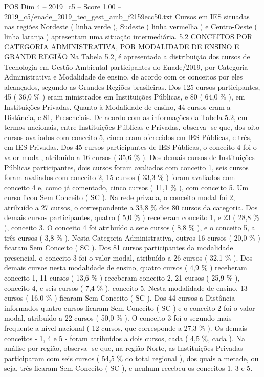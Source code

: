 \begin{textsample}{POS Dim 4 – 2019\_c5 – Score 1.00 – 2019\_c5/enade\_2019\_tec\_gest\_amb\_f2159ecc50.txt}
Cursos em IES situadas nas regiões Nordeste ( linha verde ), Sudeste ( linha vermelha ) e Centro-Oeste ( linha laranja ) apresentam uma situação intermediária. 5.2 CONCEITOS POR CATEGORIA ADMINISTRATIVA, POR MODALIDADE DE ENSINO E GRANDE REGIÃO Na Tabela 5.2, é apresentada a distribuição dos cursos de Tecnologia em Gestão Ambiental participantes do Enade/2019, por Categoria Administrativa e Modalidade de ensino, de acordo com os conceitos por eles alcançados, segundo as Grandes Regiões brasileiras.
Dos 125 cursos participantes, 45 ( 36,0 \% ) eram ministrados em Instituições Públicas, e 80 ( 64,0 \% ), em Instituições Privadas.
Quanto à Modalidade de ensino, 44 cursos eram a Distância, e 81, Presenciais.
De acordo com as informações da Tabela 5.2, em termos nacionais, entre Instituições Públicas e Privadas, observa -se que, dos oito cursos avaliados com conceito 5, cinco eram oferecidos em IES Públicas, e três, em IES Privadas.
Dos 45 cursos participantes de IES Públicas, o conceito 4 foi o valor modal, atribuído a 16 cursos ( 35,6 \% ).
Dos demais cursos de Instituições Públicas participantes, dois cursos foram avaliados com conceito 1, seis cursos foram avaliados com conceito 2, 15 cursos ( 33,3 \% ) foram avaliados com conceito 4 e, como já comentado, cinco cursos ( 11,1 \% ), com conceito 5.
Um curso ficou Sem Conceito ( SC ).
Na rede privada, o conceito modal foi 2, atribuído a 27 cursos, o correspondente a 33,8 \% dos 80 cursos da categoria.
Dos demais cursos participantes, quatro ( 5,0 \% ) receberam conceito 1, e 23 ( 28,8 \% ), conceito 3.
O conceito 4 foi atribuído a sete cursos ( 8,8 \% ), e o conceito 5, a três cursos ( 3,8 \% ).
Nesta Categoria Administrativa, outros 16 cursos ( 20,0 \% ) ficaram Sem Conceito ( SC ).
Dos 81 cursos participantes da modalidade presencial, o conceito 3 foi o valor modal, atribuído a 26 cursos ( 32,1 \% ).
Dos demais cursos nesta modalidade de ensino, quatro cursos ( 4,9 \% ) receberam conceito 1, 11 cursos ( 13,6 \% ) receberam conceito 2, 21 cursos ( 25,9 \% ), conceito 4, e seis cursos ( 7,4 \% ), conceito 5.
Nesta modalidade de ensino, 13 cursos ( 16,0 \% ) ficaram Sem Conceito ( SC ).
Dos 44 cursos a Distância informados quatro cursos ficaram Sem Conceito ( SC ) e o conceito 2 foi o valor modal, atribuído a 22 cursos ( 50,0 \% ).
O conceito 3 foi o segundo mais frequente a nível nacional ( 12 cursos, que corresponde a 27,3 \% ).
Os demais conceitos - 1, 4 e 5 - foram atribuídos a dois cursos, cada ( 4,5 \%, cada ).
Na análise por região, observa -se que, na região Norte, as Instituições Privadas participaram com seis cursos ( 54,5 \% do total regional ), dos quais a metade, ou seja, três ficaram Sem Conceito ( SC ), e nenhum recebeu os conceitos 1, 3 e 5.

\end{textsample}
